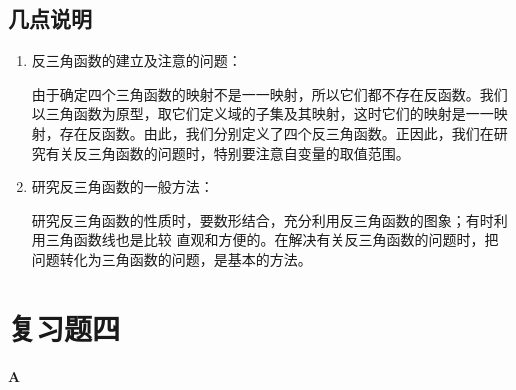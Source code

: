 







































\subsection{几点说明}
\begin{enumerate}
\item 反三角函数的建立及注意的问题：

由于确定四个三角函数的映射不是一一映射，所以它们都不存在反函数。我们以三角函数为原型，取它们定义域的子集及其映射，这时它们的映射是一一映射，存在反函数。由此，我们分别定义了四个反三角函数。正因此，我们在研究有关反三角函数的问题时，特别要注意自变量的取值范围。
\item 研究反三角函数的一般方法：

研究反三角函数的性质时，要数形结合，充分利用反三角函数的图象；有时利用三角函数线也是比较 直观和方便的。在解决有关反三角函数的问题时，把问题转化为三角函数的问题，是基本的方法。
\end{enumerate}

\section*{复习题四}

\begin{center}
\bfseries A
\end{center}

